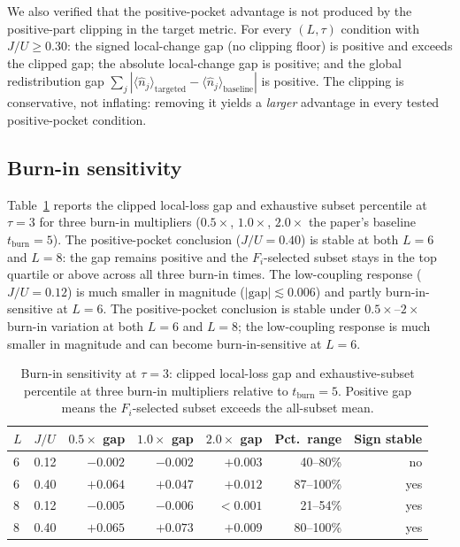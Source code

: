 \documentclass[aps,prresearch,reprint,amsmath,amssymb,longbibliography,floatfix]{revtex4-2}
\newcommand{\Fi}{F_i}
\newcommand{\nop}{\hat{n}}
\begin{document}
We also verified that the positive-pocket advantage is not produced by
the positive-part clipping in the target metric.
For every $(L,\tau)$ condition with $J/U\geq0.30$: the signed local-change
gap (no clipping floor) is positive and exceeds the clipped gap; the
absolute local-change gap is positive; and the global redistribution gap
$\sum_j|\langle\nop_j\rangle_{\mathrm{targeted}}-\langle\nop_j\rangle_{\mathrm{baseline}}|$
is positive.
The clipping is conservative, not inflating: removing it yields a
\emph{larger} advantage in every tested positive-pocket condition.

\subsection{Burn-in sensitivity}
\label{sec:burnin}

Table~\ref{tab:burnin} reports the clipped local-loss gap and exhaustive
subset percentile at $\tau=3$ for three burn-in multipliers ($0.5\times$,
$1.0\times$, $2.0\times$ the paper's baseline $t_{\mathrm{burn}}=5$).
The positive-pocket conclusion ($J/U=0.40$) is stable at both $L=6$ and
$L=8$: the gap remains positive and the $\Fi$-selected subset stays in
the top quartile or above across all three burn-in times.
The low-coupling response ($J/U=0.12$) is much smaller in magnitude
($|\text{gap}|\lesssim0.006$) and partly burn-in-sensitive at $L=6$.
The positive-pocket conclusion is stable under $0.5\times$--$2\times$
burn-in variation at both $L=6$ and $L=8$; the low-coupling response is
much smaller in magnitude and can become burn-in-sensitive at $L=6$.

\begin{table}[tbp]
\centering
\caption{Burn-in sensitivity at $\tau=3$: clipped local-loss gap and
exhaustive-subset percentile at three burn-in multipliers relative to
$t_{\mathrm{burn}}=5$.
Positive gap means the $\Fi$-selected subset exceeds the all-subset mean.}
\label{tab:burnin}
\begin{ruledtabular}
\begin{tabular}{llrrrrr}
$L$ & $J/U$ & $0.5\times$ gap & $1.0\times$ gap & $2.0\times$ gap & Pct.\ range & Sign stable \\
\hline
6 & 0.12 & $-0.002$ & $-0.002$ & $+0.003$ & 40--80\% & no \\
6 & 0.40 & $+0.064$ & $+0.047$ & $+0.012$ & 87--100\% & yes \\
8 & 0.12 & $-0.005$ & $-0.006$ & $<0.001$ & 21--54\% & yes \\
8 & 0.40 & $+0.065$ & $+0.073$ & $+0.009$ & 80--100\% & yes \\
\end{tabular}
\end{ruledtabular}
\end{table}
\end{document}
